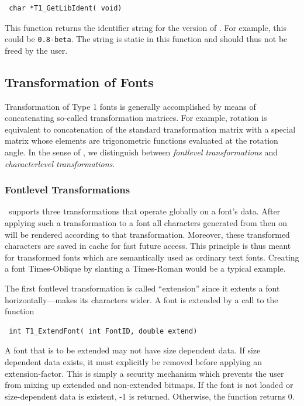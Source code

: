 \precorr
\begin{verbatim}
 char *T1_GetLibIdent( void)
\end{verbatim}\postcorr
This function returns the identifier string for the version of \tonelib. For
example, this could be \verb+0.8-beta+. The string is static in this function
and should thus not be freed by the user.


\subsection{Transformation of Fonts}
\label{transformations}%
Transformation of
Type 1 fonts is generally accomplished by means of concatenating 
so-called transformation matrices. For example, rotation is 
equivalent to concatenation of
the standard transformation matrix with a special matrix whose elements are
trigonometric functions evaluated at the rotation angle. In the sense of
\tonelib, we distinguish between {\em fontlevel transformations} and {\em
  characterlevel transformations}.

\subsubsection{Fontlevel Transformations}
\tonelib\ supports three transformations that operate globally on a font's data.
After applying such a transformation to a font all characters generated from
then on will be rendered according to that transformation. Moreover, these
transformed characters are saved in cache for fast future access. This
principle is thus meant for transformed fonts which are semantically used as
ordinary text fonts. Creating a font Times-Oblique by slanting a Times-Roman
would be a typical example.

The first fontlevel transformation is called ``extension'' since it extents a font
horizontally---makes its characters wider. A font is extended by a call to the
function
\precorr
\begin{verbatim}
 int T1_ExtendFont( int FontID, double extend)
\end{verbatim}\postcorr
A font that is to be extended may not have size dependent data. If size
dependent data exists, it must
explicitly be removed before applying an extension-factor. This is simply a
security mechanism which prevents the user from mixing up extended and
non-extended bitmaps. If the font is not loaded or size-dependent data is
existent, -1 is returned. Otherwise, the function returns 0.

